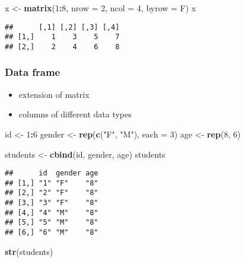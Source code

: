 \documentclass[
  a4paper,
]{article}
\newenvironment{Shaded}{\begin{snugshade}}{\end{snugshade}}
\newcommand{\AttributeTok}[1]{\textcolor[rgb]{0.13,0.29,0.53}{#1}}
\newcommand{\DecValTok}[1]{\textcolor[rgb]{0.00,0.00,0.81}{#1}}
\newcommand{\FunctionTok}[1]{\textcolor[rgb]{0.13,0.29,0.53}{\textbf{#1}}}
\newcommand{\NormalTok}[1]{#1}
\newcommand{\OtherTok}[1]{\textcolor[rgb]{0.56,0.35,0.01}{#1}}
\newcommand{\SpecialCharTok}[1]{\textcolor[rgb]{0.81,0.36,0.00}{\textbf{#1}}}
\newcommand{\StringTok}[1]{\textcolor[rgb]{0.31,0.60,0.02}{#1}}
\providecommand{\tightlist}{%
  \setlength{\itemsep}{0pt}\setlength{\parskip}{0pt}}
\begin{document}
\begin{Shaded}
\begin{Highlighting}[]
\NormalTok{x }\OtherTok{\textless{}{-}} \FunctionTok{matrix}\NormalTok{(}\DecValTok{1}\SpecialCharTok{:}\DecValTok{8}\NormalTok{, }\AttributeTok{nrow =} \DecValTok{2}\NormalTok{, }\AttributeTok{ncol =} \DecValTok{4}\NormalTok{, }\AttributeTok{byrow =}\NormalTok{ F)}
\NormalTok{x}
\end{Highlighting}
\end{Shaded}

\begin{verbatim}
##      [,1] [,2] [,3] [,4]
## [1,]    1    3    5    7
## [2,]    2    4    6    8
\end{verbatim}

\subsubsection{Data frame}\label{data-frame}

\begin{itemize}
\tightlist
\item
  extension of matrix
\item
  columns of different data types
\end{itemize}

\begin{Shaded}
\begin{Highlighting}[]
\NormalTok{id }\OtherTok{\textless{}{-}} \DecValTok{1}\SpecialCharTok{:}\DecValTok{6}
\NormalTok{gender }\OtherTok{\textless{}{-}} \FunctionTok{rep}\NormalTok{(}\FunctionTok{c}\NormalTok{(}\StringTok{"F"}\NormalTok{, }\StringTok{"M"}\NormalTok{), }\AttributeTok{each =} \DecValTok{3}\NormalTok{)}
\NormalTok{age }\OtherTok{\textless{}{-}} \FunctionTok{rep}\NormalTok{(}\DecValTok{8}\NormalTok{, }\DecValTok{6}\NormalTok{)}

\NormalTok{students }\OtherTok{\textless{}{-}} \FunctionTok{cbind}\NormalTok{(id, gender, age)}
\NormalTok{students}
\end{Highlighting}
\end{Shaded}

\begin{verbatim}
##      id  gender age
## [1,] "1" "F"    "8"
## [2,] "2" "F"    "8"
## [3,] "3" "F"    "8"
## [4,] "4" "M"    "8"
## [5,] "5" "M"    "8"
## [6,] "6" "M"    "8"
\end{verbatim}

\begin{Shaded}
\begin{Highlighting}[]
\FunctionTok{str}\NormalTok{(students)}
\end{Highlighting}
\end{Shaded}
\end{document}
